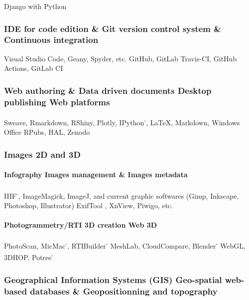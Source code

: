 \documentclass{article}
\begin{document}
\textsf{Django} with \textsf{Python}

\subsubsection*{IDE for code edition \& Git version control system \& Continuous integration} 

Visual Studio Code, Geany, Spyder, etc. \textbf{{\textbar}} GitHub, GitLab \textbf{{\textbar}} Travis-CI, GitHub Actions, GitLab CI

\subsubsection*{Web authoring \& Data driven documents {\textbar} Desktop publishing {\textbar} Web platforms}

\textsf{Sweave}, \textsf{Rmarkdown}, \textsf{RShiny}, \textsf{Plotly}, \textsf{IPython\textsuperscript{-}}, \textbf{{\textbar}} \LaTeX, \textsf{Markdown}, Windows Office \textbf{{\textbar}} RPubs, HAL, Zenodo

\subsubsection*{Images 2D and 3D}

\paragraph*{Infography {\textbar} Images management \& Images metadata}

IIIF\textsuperscript{-}, ImageMagick, ImageJ, and current graphic softwares (Gimp, Inkscape, Photoshop, Illustrator) {\textbar} ExifTool , XnView, Piwigo, etc.

\paragraph*{Photogrammetry/RTI {\textbar} 3D creation {\textbar} Web 3D}

PhotoScan, MicMac\textsuperscript{-}, RTIBuilder\textsuperscript{-} {\textbar} MeshLab, CloudCompare, Blender\textsuperscript{-} \textbf{{\textbar}} WebGL, 3DHOP, Potree\textsuperscript{-}

\subsubsection*{Geographical Information Systems (GIS) {\textbar} Geo-spatial web-based databases \&  {\textbar} Geopositionning and topography}
\end{document}
